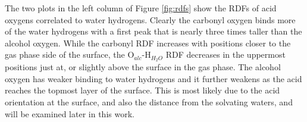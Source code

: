 The two plots in the left column of Figure \ref{fig:rdfs} show the RDFs of acid oxygens correlated to water hydrogens. Clearly the carbonyl oxygen binds more of the water hydrogens with a first peak that is nearly three times taller than the alcohol oxygen. While the carbonyl RDF increases with positions closer to the gas phase side of the surface, the O$_{alc}$-H$_{H_2O}$ RDF decreases in the uppermost positions just at, or slightly above the surface in the gas phase. The alcohol oxygen has weaker binding to water hydrogens and it further weakens as the acid reaches the topmost layer of the surface. This is most likely due to the acid orientation at the surface, and also the distance from the solvating waters, and will be examined later in this work.

